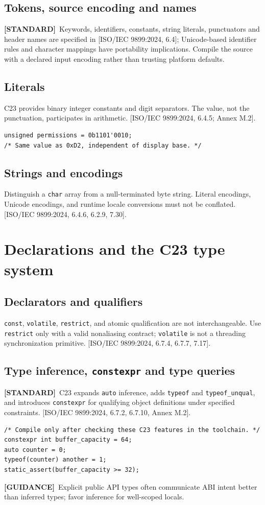 \documentclass[10pt,letterpaper,oneside]{report}
\newcommand{\refcl}[1]{\textsf{\footnotesize[ISO/IEC 9899:2024, #1]}}
\newcommand{\standard}{\textbf{[STANDARD]}}
\newcommand{\guidance}{\textbf{[GUIDANCE]}}
\begin{document}
\section{Tokens, source encoding and names}
\standard\ Keywords, identifiers, constants, string literals, punctuators and header names are specified in \refcl{6.4}; Unicode-based identifier rules and character mappings have portability implications. Compile the source with a declared input encoding rather than trusting platform defaults.
\section{Literals}
C23 provides binary integer constants and digit separators. The value, not the punctuation, participates in arithmetic. \refcl{6.4.5; Annex M.2}.
\begin{lstlisting}
unsigned permissions = 0b1101'0010;
/* Same value as 0xD2, independent of display base. */
\end{lstlisting}
\section{Strings and encodings}
Distinguish a \texttt{char} array from a null-terminated byte string. Literal encodings, Unicode encodings, and runtime locale conversions must not be conflated. \refcl{6.4.6, 6.2.9, 7.30}.
\chapter{Declarations and the C23 type system}
\section{Declarators and qualifiers}
\texttt{const}, \texttt{volatile}, \texttt{restrict}, and atomic qualification are not interchangeable. Use \texttt{restrict} only with a valid nonaliasing contract; \texttt{volatile} is not a threading synchronization primitive. \refcl{6.7.4, 6.7.7, 7.17}.
\section{Type inference, \texttt{constexpr} and type queries}
\standard\ C23 expands \texttt{auto} inference, adds \texttt{typeof} and \texttt{typeof\_unqual}, and introduces \texttt{constexpr} for qualifying object definitions under specified constraints. \refcl{6.7.2, 6.7.10, Annex M.2}.
\begin{lstlisting}
/* Compile only after checking these C23 features in the toolchain. */
constexpr int buffer_capacity = 64;
auto counter = 0;
typeof(counter) another = 1;
static_assert(buffer_capacity >= 32);
\end{lstlisting}
\guidance\ Explicit public API types often communicate ABI intent better than inferred types; favor inference for well-scoped locals.
\end{document}

